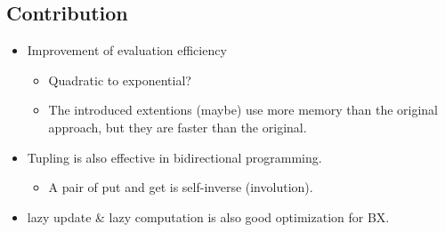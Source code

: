 \documentclass[runningheads]{llncs}
\begin{document}
\subsection{Contribution}

\begin{itemize}
\item Improvement of evaluation efficiency
  \begin{itemize}
  \item Quadratic to exponential? 
  \item The introduced extentions (maybe) use more memory than the original approach, but they are faster than the original.
  \end{itemize}
\item Tupling is also effective in bidirectional programming.
  \begin{itemize}
  \item A pair of put and get is self-inverse (involution).
  \end{itemize}
\item lazy update \& lazy computation is also good optimization for BX.
  \end{itemize}


\end{document}
